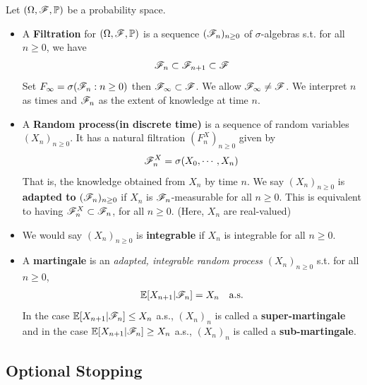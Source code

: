 \documentclass[10pt,a4paper]{report}
\begin{document}
Let $(\Omega, \mathscr{F}, \mathbb{P})$ be a probability space.


\begin{itemize}
\item A \textbf{Filtration} for $(\Omega, \mathscr{F}, \mathbb{P})$ is a sequence $(\mathscr{F}_n)_{n\geq 0}$ of $\sigma$-algebras s.t. for all $n \geq 0$, we have
\begin{align*}
\mathscr{F}_n\subset \mathscr{F}_{n+1} \subset \mathscr{F}
\end{align*}
Set $F_{\infty} = \sigma(\mathscr{F}_n:n\geq 0)$ then $\mathscr{F}_{\infty} \subset \mathscr{F}$. We allow $\mathscr{F}_{\infty} \neq \mathscr{F}$. We interpret $n$ as times and $\mathscr{F}_n$ as the extent of knowledge at time $n$.

\item A \textbf{Random process(in discrete time)} is a sequence of random variables $(X_n)_{n\geq 0}$. It has a natural filtration $(F_n^X)_{n\geq 0}$ given by
\begin{align*}
\mathscr{F}_n^X = \sigma(X_0, \cdots, X_n)
\end{align*}
That is, the knowledge obtained from $X_n$ by time $n$. We say $(X_n)_{n\geq 0}$ is \textbf{adapted to} $(\mathscr{F}_n)_{n\geq 0}$ if $X_n$ is $\mathscr{F}_n$-measurable for all $n\geq 0$. This is equivalent to having $\mathscr{F}_n^X \subset \mathscr{F}_n$, for all $n \geq 0$. (Here, $X_n$ are real-valued) 

\item We would say $(X_n)_{n\geq 0}$ is \textbf{integrable} if $X_n$ is integrable for all $n\geq 0$.

\item A \textbf{martingale} is an \emph{adapted, integrable random process} $(X_n)_{n\geq 0}$ s.t. for all $n\geq 0$,
\begin{align*}
\mathbb{E}[X_{n+1} |\mathscr{F}_n] = X_n \quad \text{a.s.}
\end{align*}
In the case $\mathbb{E}[X_{n+1} |\mathscr{F}_n] \leq X_n$ a.s., $(X_n)_n$ is called a \textbf{super-martingale} and in the case $\mathbb{E}[X_{n+1} |\mathscr{F}_n] \geq X_n $ a.s., $(X_n)_n$ is called a \textbf{sub-martingale}.
\end{itemize}

\newcommand{\randp}{(X_n)_{n \geq 0}} %

\subsection*{Optional Stopping}
\end{document}

